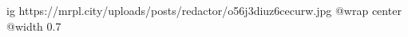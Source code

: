  
 
 
 
 

\ifcmt
  ig https://mrpl.city/uploads/posts/redactor/o56j3diuz6cecurw.jpg
  @wrap center
  @width 0.7
\fi
